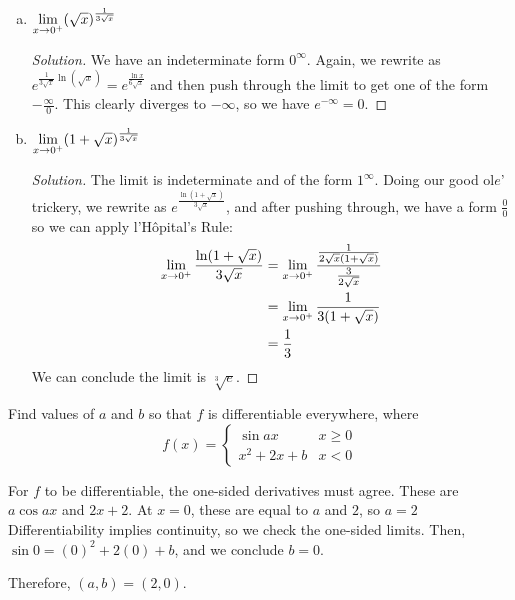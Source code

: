 \documentclass{agony}
\begin{document}
\begin{prob}
\begin{enumerate}[(a)]
\begin{proof}[Solution]
          \end{proof}
    \item $\lim\limits_{x\to0^+}(\sqrt{x})^{\frac{1}{3\sqrt{x}}}$
          \begin{proof}[Solution]
            We have an indeterminate form $0^\infty$.
            Again, we rewrite as $e^{\frac{1}{3\sqrt{x}}\ln(\sqrt{x})} = e^{\frac{\ln x}{6\sqrt{x}}}$
            and then push through the limit to get one of the form $-\frac{\infty}{0}$.
            This clearly diverges to $-\infty$, so we have $e^{-\infty} = 0$.
          \end{proof}
    \item $\lim\limits_{x\to0^+}(1+\sqrt{x})^{\frac{1}{3\sqrt{x}}}$
          \begin{proof}[Solution]
            The limit is indeterminate and of the form $1^{\infty}$.
            Doing our good ol$e$' trickery, we rewrite as $e^{\frac{\ln(1+\sqrt{x})}{3\sqrt{x}}}$,
            and after pushing through, we have a form $\frac{0}{0}$ so we can apply l'Hôpital's Rule:
            \begin{align*}
              \lim\limits_{x\to0^+} \frac{\ln(1+\sqrt{x})}{3\sqrt{x}}
               & = \lim\limits_{x\to0^+} \frac{\frac{1}{2\sqrt{x}(1+\sqrt{x})}}{\frac{3}{2\sqrt{x}}} \\
               & = \lim\limits_{x\to0^+} \frac{1}{3(1+\sqrt{x})}                                     \\
               & = \frac13
            \end{align*}
            We can conclude the limit is $\sqrt[3]{e}$.
          \end{proof}
  \end{enumerate}
\end{prob}

\begin{prob}
  Find values of $a$ and $b$ so that $f$ is differentiable everywhere, where
  \[ f(x) = \begin{cases}
      \sin ax      & x \geq 0 \\
      x^2 + 2x + b & x < 0
    \end{cases} \]
\end{prob}
\begin{sol}
  For $f$ to be differentiable, the one-sided derivatives must agree.
  These are $a\cos ax$ and $2x + 2$.
  At $x=0$, these are equal to $a$ and $2$, so $a=2$
  Differentiability implies continuity, so we check the one-sided limits.
  Then, $\sin 0 = (0)^2 + 2(0) + b$, and we conclude $b=0$.

  Therefore, $(a,b) = (2,0)$.
\end{sol}
\end{document}
